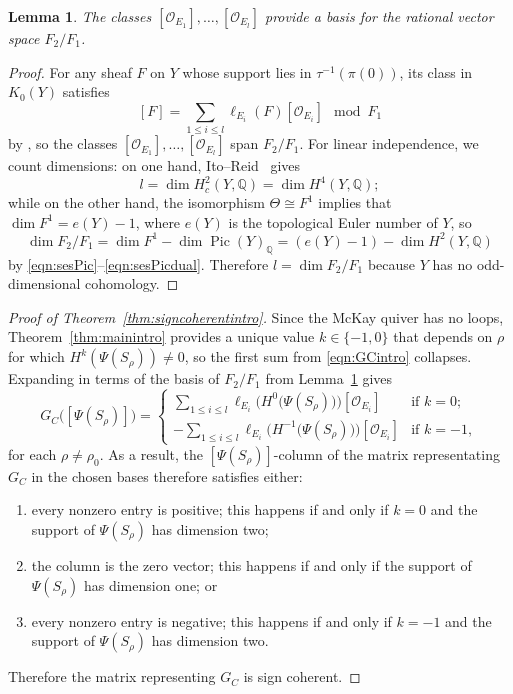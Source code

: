 \documentclass[11pt,reqno]{amsart}
\numberwithin{equation}{section}
\newtheorem{lemma}[theorem]{Lemma}
\theoremstyle{definition}
\newcommand{\QQ}{\ensuremath{\mathbb{Q}}}
\newcommand{\chamber}{C}
\newcommand{\0}{\operatorname{0}}
\newcommand{\Pic}{\operatorname{Pic}}
\begin{document}
 \begin{lemma}
 \label{lem:F2/F1basis}
  The classes $[\mathcal{O}_{E_1}], \dots , [\mathcal{O}_{E_l}]$ provide a basis for the rational vector space $F_2/F_1$.
  \end{lemma}
  \begin{proof}
  For any sheaf $F$ on $Y$ whose support lies in $\tau^{-1}(\pi(0))$, its class in $K_0(Y)$ satisfies 
  \[
  [F] = \sum_{1\leq i\leq l} \ell_{E_i}(F)[\mathcal{O}_{E_i}] \mod F_1
  \]
  by \cite[Expose X, Proposition~1.1.2]{SGA6}, so the classes $[\mathcal{O}_{E_1}], \dots , [\mathcal{O}_{E_l}]$ span $F_2/F_1$. For linear independence, we count dimensions: on one hand, Ito--Reid~\cite[Theorem 1.6]{IR96} gives 
  \[
  l=\dim H^2_c(Y,\QQ) =  \dim H^4(Y,\QQ);
  \]
 while on the other hand,  the isomorphism $\Theta\cong F^1$  implies that $\dim F^1 = e(Y) - 1$, where $e(Y)$ is the topological Euler number of $Y$, so    
 \[
 \dim F_2/F_1 = \dim F^1-\dim \Pic(Y)_{\QQ} = (e(Y) - 1) -\dim H^2(Y,\QQ)
 \]
by \eqref{eqn:sesPic}--\eqref{eqn:sesPicdual}. Therefore $l=\dim F_2/F_1$ because $Y$ has no odd-dimensional cohomology.
  \end{proof}
  
 \begin{proof}[Proof of Theorem~\ref{thm:signcoherentintro}]
 Since the McKay quiver has no loops, Theorem~\ref{thm:mainintro} provides a unique value $k\in \{-1,0\}$ that depends on $\rho$ for which $H^k(\Psi(S_\rho))\neq 0$, so the first sum from \eqref{eqn:GCintro} collapses. Expanding in terms of the basis of $F_2/F_1$ from  Lemma~\ref{lem:F2/F1basis} gives
   \begin{equation}
     \label{eqn:GCbasis}
G_{\chamber}\big([\Psi(S_\rho)]\big) = \left\{\begin{array}{rr}
\sum_{1\leq i\leq l} \ell_{E_i}\big(H^0\big(\Psi(S_\rho)\big)\big)[\mathcal{O}_{E_i}]  & \text{if }k=0; \\
-\sum_{1\leq i\leq l} \ell_{E_i}\big(H^{-1}\big(\Psi(S_\rho)\big)\big)[\mathcal{O}_{E_i}]  & \text{if }k=-1,
\end{array}\right.
 \end{equation}
  for each $\rho\neq \rho_0$. As a result, the $[\Psi(S_\rho)]$-column of the matrix representating $G_C$ in the chosen bases therefore satisfies either:
 \begin{enumerate}
 \item[\ensuremath{(+)}] every nonzero entry is positive; this happens if and only if $k=0$ and the support of $\Psi(S_\rho)$ has dimension two;
 \item[\ensuremath{(0)}] the column is the zero vector; this happens if and only if the support of $\Psi(S_\rho)$ has dimension one; or
  \item[\ensuremath{(-)}] every nonzero entry is negative; this happens if and only if $k=-1$ and the support of $\Psi(S_\rho)$ has dimension two.
 \end{enumerate}
 Therefore the matrix representing $G_C$ is sign coherent. \end{proof}
 
\end{document}
